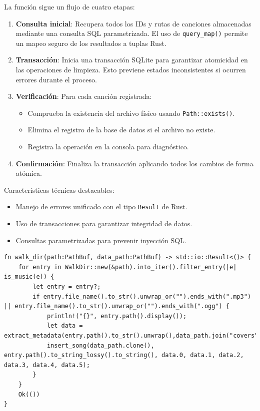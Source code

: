 \documentclass[11pt, a4paper]{article}
\begin{document}
            La función sigue un flujo de cuatro etapas:

            \begin{enumerate}
              \item \textbf{Consulta inicial}: Recupera todos los IDs y rutas de canciones almacenadas mediante una consulta SQL parametrizada. El uso de \texttt{query\_map()} permite un mapeo seguro de los resultados a tuplas Rust.

              \item \textbf{Transacción}: Inicia una transacción SQLite para garantizar atomicidad en las operaciones de limpieza. Esto previene estados inconsistentes si ocurren errores durante el proceso.

              \item \textbf{Verificación}: Para cada canción registrada:
                \begin{itemize}
                  \item Comprueba la existencia del archivo físico usando \texttt{Path::exists()}.
                  \item Elimina el registro de la base de datos si el archivo no existe.
                  \item Registra la operación en la consola para diagnóstico.
                \end{itemize}

              \item \textbf{Confirmación}: Finaliza la transacción aplicando todos los cambios de forma atómica.
            \end{enumerate}

            Características técnicas destacables:
            \begin{itemize}
              \item Manejo de errores unificado con el tipo \texttt{Result} de Rust.
              \item Uso de transacciones para garantizar integridad de datos.
              \item Consultas parametrizadas para prevenir inyección SQL.
            \end{itemize}

            \begin{lstlisting}[caption={fn walk\_dir()}]
 fn walk_dir(path:PathBuf, data_path:PathBuf) -> std::io::Result<()> {
    for entry in WalkDir::new(&path).into_iter().filter_entry(|e| is_music(e)) {
        let entry = entry?;
        if entry.file_name().to_str().unwrap_or("").ends_with(".mp3") || entry.file_name().to_str().unwrap_or("").ends_with(".ogg") {
            println!("{}", entry.path().display());
            let data = extract_metadata(entry.path().to_str().unwrap(),data_path.join("covers"))?;
            insert_song(data_path.clone(), entry.path().to_string_lossy().to_string(), data.0, data.1, data.2, data.3, data.4, data.5);
        }
    }
    Ok(())
}
            \end{lstlisting}
\end{document}
